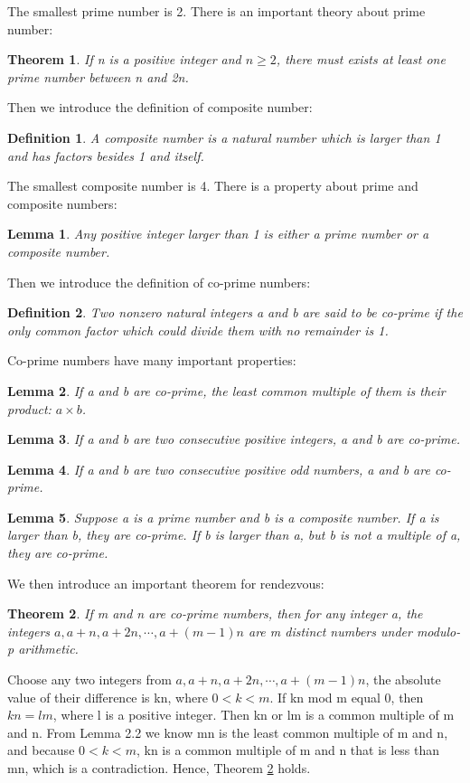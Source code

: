 \documentclass[10pt, conference, letterpaper]{IEEEtran}
\newtheorem{theorem}{Theorem}
\newtheorem{lemma}{Lemma}[section]
\newtheorem{definition}{Definition}[section]
\begin{document}
The smallest prime number is 2. There is an important theory about prime number:
\begin{theorem}
If n is a positive integer and $n \ge 2$, there must exists at least one prime number between n and 2n.
\end{theorem}

Then we introduce the definition of composite number:
\begin{definition}
A composite number is a natural number which is larger than 1 and has factors besides 1 and itself.
\end{definition}

The smallest composite number is 4. There is a property about prime and composite numbers:

\begin{lemma}
Any positive integer larger than 1 is either a prime number or a composite number.
\end{lemma}

Then we introduce the definition of co-prime numbers:
\begin{definition}
Two nonzero natural integers a and b are said to be co-prime if the only common factor which could divide them with no remainder is 1.
\end{definition}

Co-prime numbers have many important properties:
\begin{lemma}
If a and b are co-prime, the least common multiple of them is their product: $a \times b$.
\end{lemma}
\begin{lemma}
If a and b are two consecutive positive integers, a and b are co-prime.
\end{lemma}
\begin{lemma}
If a and b are two consecutive positive odd numbers, a and b are co-prime.
\end{lemma}
\begin{lemma}
Suppose a is a prime number and b is a composite number. If a is larger than b, they are co-prime. If b is larger than a, but b is not a multiple of a, they are co-prime.
\end{lemma}

We then introduce an important theorem for rendezvous:
\begin{theorem}
\label{theo}
If m and n are co-prime numbers, then for any integer a, the integers $a, a + n, a + 2n,\cdots, a+(m-1)n$ are m distinct numbers under modulo-p arithmetic.
\end{theorem}
\begin{IEEEproof}
Choose any two integers from $a, a+n, a + 2n,\cdots, a+(m-1)n$, the absolute value of their difference is kn, where $0 < k < m$. If kn mod m equal 0, then $kn = lm$, where l is a positive integer. Then kn or lm is a common multiple of m and n. From Lemma 2.2 we know mn is the least common multiple of m and n, and because $0 < k < m$, kn is a common multiple of m and n that is less than mn, which is a contradiction. Hence, Theorem \ref{theo} holds.
\end{IEEEproof}
\end{document}
